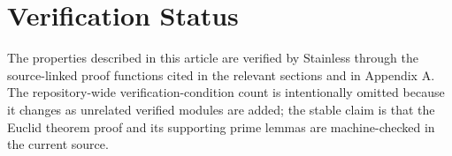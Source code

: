 \section{Verification Status}
\label{sec:verification-status}

The properties described in this article are verified by Stainless
through the source-linked proof functions cited in the relevant sections
and in Appendix A. The repository-wide verification-condition count is
intentionally omitted because it changes as unrelated verified modules are
added; the stable claim is that the Euclid theorem proof and its
supporting prime lemmas are machine-checked in the current source.
